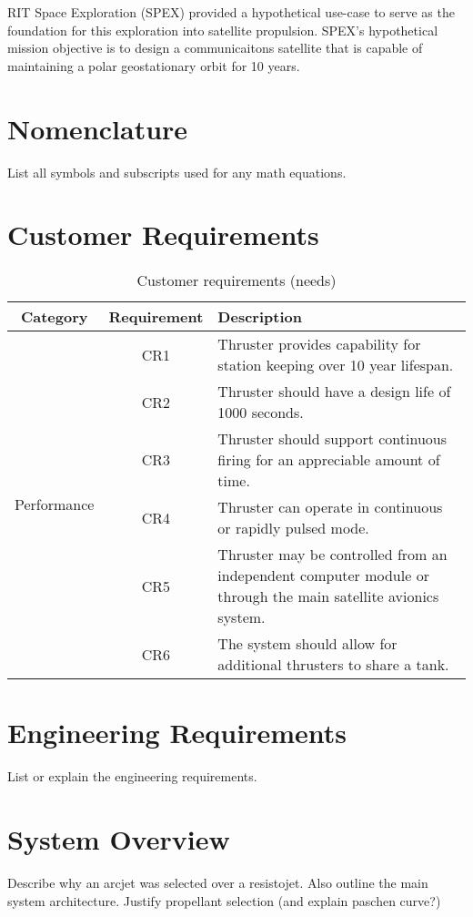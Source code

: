 \documentclass[journal]{IEEEtran}
\begin{document}
RIT Space Exploration (SPEX) provided a hypothetical use-case to serve as the foundation for this exploration into satellite propulsion.
SPEX's hypothetical mission objective is to design a communicaitons satellite that is capable of maintaining a polar geostationary orbit for 10 years.

\section{Nomenclature}
\label{S:nomenclature}
List all symbols and subscripts used for any math equations.

\section{Customer Requirements}
\label{S:creqs}
\begin{table}[htp]
  \caption{Customer requirements (needs)}
\label{tab:creqs}
  \begin{tabular}{c c p{1.9in}}
    \hline
    \textbf{Category} & \textbf{Requirement} & \textbf{Description} \\
    \hline
    \multirow{7}{*}{Performance} & CR1 & Thruster provides capability for station keeping over 10 year lifespan. \\
    & CR2 & Thruster should have a design life of 1000 seconds. \\
    & CR3 & Thruster should support continuous firing for an appreciable amount of time. \\
    & CR4 & Thruster can operate in continuous or rapidly pulsed mode. \\
    \hline
    \multirow{5}{*}{Integration} & CR5 & Thruster may be controlled from an independent computer module or through the main satellite avionics system. \\
    & CR6 & The system should allow for additional thrusters to share a tank. \\
    \hline
  \end{tabular}
\end{table}

\section{Engineering Requirements}
List or explain the engineering requirements.

\section{System Overview}
Describe why an arcjet was selected over a resistojet.
Also outline the main system architecture.
Justify propellant selection (and explain paschen curve?)
\end{document}
